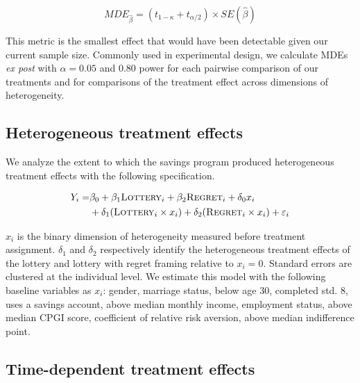\documentclass[11pt]{article}
\begin{document}
		\begin{equation}
			MDE_{\hat \beta} = (t_{1-\kappa} + t_{\alpha/2}) \times SE(\hat \beta)
		\label{eq:mde} \end{equation}

		This metric is the smallest effect that would have been detectable given our current sample size. Commonly used in experimental design, we calculate MDEs \textit{ex post} with $\alpha = 0.05$ and 0.80 power for each pairwise comparison of our treatments and for comparisons of the treatment effect across dimensions of heterogeneity.


	\subsection{Heterogeneous treatment effects}

		We analyze the extent to which the savings program produced heterogeneous treatment effects with the following specification.

		\begin{equation} \begin{split}
		Y_{i} = & \beta_{0} + \beta_{1}\text{\textsc{Lottery}}_{i} + \beta_{2}\text{\textsc{Regret}}_{i} + \delta_{0}x_{i} \\
					& + \delta_{1}(\text{\textsc{Lottery}}_{i} \times x_{i}) + \delta_{2}(\text{\textsc{Regret}}_{i} \times x_{i}) + \varepsilon_{i}
		\end{split} \label{eq:heteffect} \end{equation}

		$x_{i}$ is the binary dimension of heterogeneity measured before treatment assignment. $\delta_{1}$ and $\delta_{2}$ respectively identify the heterogeneous treatment effects of the lottery and lottery with regret framing relative to $x_{i} = 0$. Standard errors are clustered at the individual level. We estimate this model with the following baseline variables as $x_{i}$: gender, marriage status, below age 30, completed std. 8, uses a savings account, above median monthly income, employment status, above median CPGI score, coefficient of relative risk aversion, above median indifference point.

	\subsection{Time-dependent treatment effects}
\end{document}
